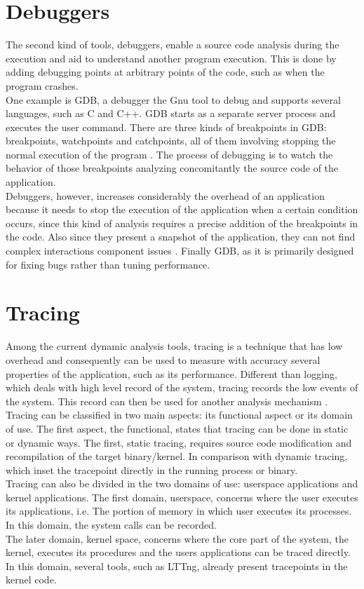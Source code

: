 \section{Debuggers}
The second kind of tools, debuggers, enable a source code analysis during the execution and aid to understand another program execution. This is done by adding debugging points at arbitrary points of the code, such as when the program crashes.\\
One example is GDB, a debugger the Gnu tool to debug and supports several languages, such as  C and C++. GDB starts as a separate server process and executes the user command. 
There are three kinds of breakpoints in GDB: breakpoints, watchpoints and catchpoints, all of them involving stopping the normal execution of the program \cite{gdb_breakpoint}. The process of debugging is to watch the behavior of those breakpoints analyzing concomitantly the source code of the application.\\
Debuggers, however, increases considerably the overhead of an application because it needs to stop the execution of the application when a certain condition occurs, since this kind of analysis requires a precise addition of the breakpoints in the code. Also since they present a snapshot of the application, they can not find complex interactions component issues \cite{multicore_system_debug}. Finally GDB, as it is primarily designed for fixing bugs rather than tuning performance. \\
\section{Tracing}
Among the current dynamic analysis tools, tracing is a technique that has low overhead and consequently can be used to measure with accuracy several properties of the application, such as its performance.  Different than logging, which deals with high level record of the system, tracing records the low events of the system. This record can then be used for another analysis mechanism \cite{desnoyer}.\\
Tracing can be classified in two main aspects: its functional aspect or its domain of use. The first aspect, the functional, states that tracing can be done in static or dynamic ways. The first, static tracing, requires source code modification and recompilation of the target binary/kernel. In comparison with dynamic tracing, which inset the tracepoint directly in the running process or binary.\\
Tracing can also be divided in the two domains of use: userspace applications and kernel applications.
The first domain, userspace, concerns where the user executes its applications, i.e. The portion of memory in which user executes its processes. In this domain, the system calls can be recorded.\\
The later domain, kernel space, concerns where the core part of the system, the kernel, executes its procedures and the users applications can be traced directly. In this domain, several tools, such as LTTng, already present tracepoints in the kernel code.
